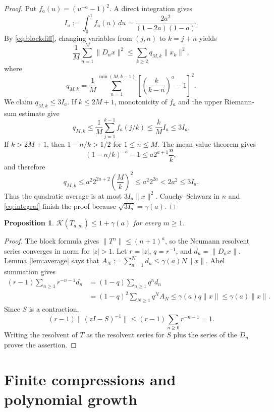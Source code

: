 \documentclass[10pt]{article}
\newtheorem{proposition}{Proposition}
\newcommand{\Kreiss}{\mathcal K}
\begin{document}
\begin{proof}
Put $f_a(u)=(u^{-a}-1)^2$.  A direct integration gives
\begin{equation}\label{eq:integral}
 I_a:=\int_0^1 f_a(u)\,du
 =\frac{2a^2}{(1-2a)(1-a)}.
\end{equation}
By \eqref{eq:blockdiff}, changing variables from $(j,n)$ to $k=j+n$ yields
\[
 \frac1M\sum_{n=1}^M\|D_nx\|^2
 \le\sum_{k\ge2}q_{M,k}\|x_k\|^2,
\]
where
\[
 q_{M,k}=\frac1M\sum_{n=1}^{\min(M,k-1)}
 \left[\left(\frac{k}{k-n}\right)^a-1\right]^2.
\]
We claim $q_{M,k}\le3I_a$.  If $k\le2M+1$, monotonicity of $f_a$ and the
upper Riemann-sum estimate give
\[
 q_{M,k}\le\frac1M\sum_{j=1}^{k-1}f_a(j/k)
 \le\frac{k}{M}I_a\le3I_a.
\]
If $k>2M+1$, then $1-n/k>1/2$ for $1\le n\le M$.  The mean value theorem
gives
\[
 (1-n/k)^{-a}-1\le a2^{a+1}\frac nk,
\]
and therefore
\[
 q_{M,k}\le a^2 2^{2a+2}\left(\frac Mk\right)^2
 \le a^2 2^{2a}<2a^2\le3I_a.
\]
Thus the quadratic average is at most $3I_a\|x\|^2$.  Cauchy--Schwarz in
$n$ and \eqref{eq:integral} finish the proof because
$\sqrt{3I_a}=\gamma(a)$.
\end{proof}

\begin{proposition}\label{prop:kreiss}
$\Kreiss(T_{a,m})\le1+\gamma(a)$ for every $m\ge1$.
\end{proposition}

\begin{proof}
The block formula gives $\|T^n\|\le(n+1)^a$, so the Neumann resolvent series
converges in norm for $|z|>1$.  Let $r=|z|$, $q=r^{-1}$, and
$d_n=\|D_nx\|$.  Lemma \ref{lem:average} says that
$A_N:=\sum_{n=1}^Nd_n\le\gamma(a)N\|x\|$.  Abel summation gives
\begin{align*}
 (r-1)\sum_{n\ge1}r^{-n-1}d_n
 &=(1-q)\sum_{n\ge1}q^nd_n\\
 &=(1-q)^2\sum_{N\ge1}q^N A_N
 \le\gamma(a)q\|x\|\le\gamma(a)\|x\|.
\end{align*}
Since $S$ is a contraction,
\[
 (r-1)\|(zI-S)^{-1}\|
 \le(r-1)\sum_{n\ge0}r^{-n-1}=1.
\]
Writing the resolvent of $T$ as the resolvent series for $S$ plus the series
of the $D_n$ proves the assertion.
\end{proof}

\section{Finite compressions and polynomial growth}
\end{document}
